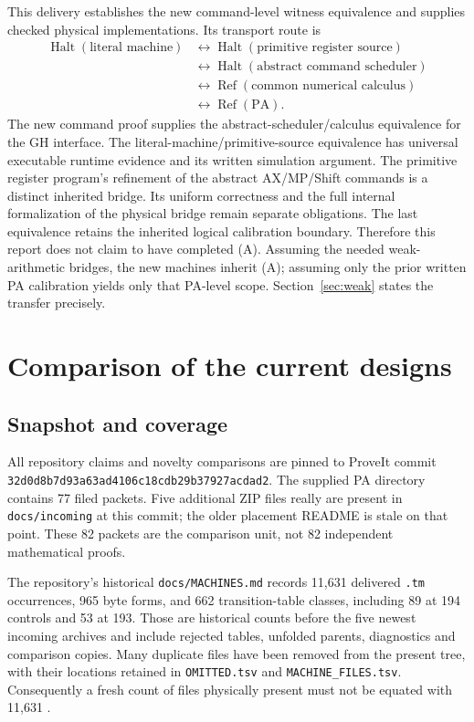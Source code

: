 \documentclass[11pt,letterpaper]{article}
\newcommand{\PA}{\mathrm{PA}}
\newcommand{\Halt}{\operatorname{Halt}}
\newcommand{\file}[1]{\texttt{\nolinkurl{#1}}}
\newcommand{\snap}{\nolinkurl{32d0d8b7d93a63ad4106c18cdb29b37927acdad2}}
\begin{document}
This delivery establishes the new command-level witness equivalence and
supplies checked physical implementations. Its transport route is
\[
\begin{aligned}
 \Halt(\text{literal machine})
 &\longleftrightarrow \Halt(\text{primitive register source})\\
 &\longleftrightarrow \Halt(\text{abstract command scheduler})\\
 &\longleftrightarrow \operatorname{Ref}(\text{common numerical calculus})\\
 &\longleftrightarrow \operatorname{Ref}(\PA).
\end{aligned}
\]
The new command proof supplies the abstract-scheduler/calculus equivalence
for the GH interface. The literal-machine/primitive-source equivalence has
universal executable runtime evidence and its written simulation argument.
The primitive register program's refinement of the abstract AX/MP/Shift
commands is a distinct inherited bridge. Its uniform correctness and the
full internal formalization of the physical bridge remain separate
obligations. The last equivalence retains the inherited logical
calibration boundary. Therefore this report does not claim to have
completed (A). Assuming the needed weak-arithmetic bridges, the new
machines inherit (A); assuming only the prior written PA calibration yields
only that PA-level scope. Section~\ref{sec:weak} states the transfer precisely.

\section{Comparison of the current designs}
\label{sec:comparison}

\subsection{Snapshot and coverage}

All repository claims and novelty comparisons are pinned to ProveIt commit
\snap. The supplied PA directory contains 77 filed packets. Five additional
ZIP files really are present in \file{docs/incoming} at this commit; the older
placement README is stale on that point. These 82 packets are the comparison
unit, not 82 independent mathematical proofs.

The repository's historical \file{docs/MACHINES.md} records 11,631 delivered
\file{.tm} occurrences, 965 byte forms, and 662 transition-table classes,
including 89 at 194 controls and 53 at 193. Those are historical counts
before the five newest incoming archives and include rejected tables,
unfolded parents, diagnostics and comparison copies. Many duplicate files
have been removed from the present tree, with their locations retained in
\file{OMITTED.tsv} and \file{MACHINE_FILES.tsv}. Consequently a fresh count of
files physically present must not be equated with 11,631 \cite{catalog}.
\end{document}
